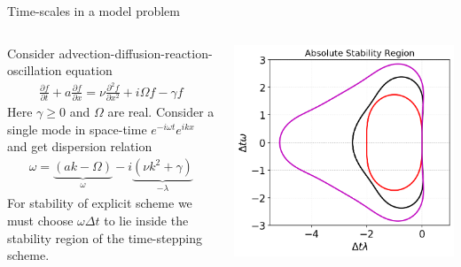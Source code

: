\documentclass[aspectratio=169]{beamer}
\newcommand{\pfrac}[2]{\frac{\partial #1}{\partial #2}}
\begin{document}
\begin{frame}{Time-scales in a model problem}
  \begin{columns}
    
    \begin{column}{0.5\linewidth}
      \small%
      Consider advection-diffusion-reaction-oscillation equation
      \begin{align*}
        \pfrac{f}{t} + a\pfrac{f}{x} = \nu \frac{\partial^2 f}{\partial x^2} + i\Omega f - \gamma f
      \end{align*}
      Here $\gamma \ge 0$ and $\Omega$ are real. Consider a single mode
      in space-time $e^{-i\omega t}e^{i k x}$ and get dispersion relation
      \begin{align*}
        \omega = \underbrace{(a k - \Omega)}_{ \omega}
        - i \underbrace{(\nu k^2 + \gamma)}_{-\lambda}
      \end{align*}
      For stability of explicit scheme we must choose
      $\omega \Delta t$ to lie inside the stability region of the
      time-stepping scheme.
    \end{column}
    
    \begin{column}{0.4\linewidth}
      \includegraphics[width=\linewidth]{ssp-rk-abs-stability.png}
    \end{column}
  \end{columns}

\end{frame}
\end{document}
